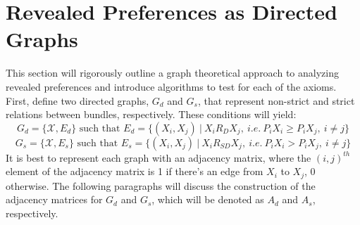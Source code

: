 \documentclass{article} %
\theoremstyle{style1}
\theoremstyle{example}
\begin{document}
\section{Revealed Preferences as Directed Graphs}\label{sec:rev_pref_as_digraph}

This section will rigorously outline a graph theoretical approach to analyzing revealed preferences and introduce algorithms to test for each of the axioms. First, define two directed graphs, $G_d$ and $G_s$, that represent non-strict and strict relations between bundles, respectively. These conditions will yield:
$$G_d=\{\mathcal{X},E_d\}\textrm{ such that }E_d=\{(X_i,X_j)\ |\ X_i R_D X_j,\ i.e.\ P_iX_i\geq P_iX_j,\ i\not=j\}$$
$$G_s=\{\mathcal{X},E_s\}\textrm{ such that }E_s=\{(X_i,X_j)\ |\ X_i R_{SD} X_j,\ i.e.\ P_iX_i> P_iX_j,\ i\not=j\}$$
It is best to represent each graph with an adjacency matrix, where the $(i,j)^{th}$ element of the adjacency matrix is 1 if there's an edge from $X_i$ to $X_j$, 0 otherwise. The following paragraphs will discuss the construction of the adjacency matrices for $G_d$ and $G_s$, which will be denoted as $A_d$ and $A_s$, respectively.
\end{document}
